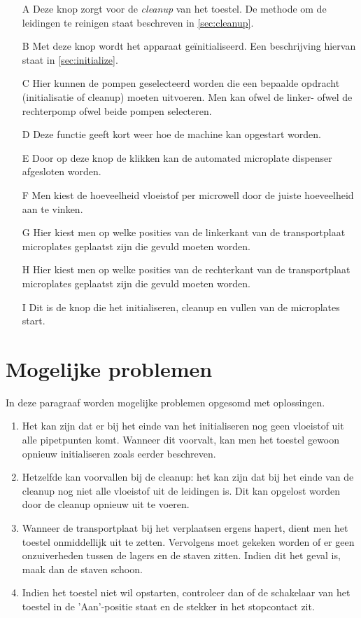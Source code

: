 \documentclass[a4paper,twoside,kulak]{kulakreport} %
\begin{document}
\begin{itemize}
	\item[A] Deze knop zorgt voor de \textit{cleanup} van het toestel. De methode om de leidingen te reinigen staat beschreven in \ref{sec:cleanup}.
	\item[B] Met deze knop wordt het apparaat geïnitialiseerd. Een beschrijving hiervan staat in \ref{sec:initialize}.
	\item[C] Hier kunnen de pompen geselecteerd worden die een bepaalde opdracht (initialisatie of cleanup) moeten uitvoeren. Men kan ofwel de linker- ofwel de rechterpomp ofwel beide pompen selecteren. 
	\item[D] Deze functie geeft kort weer hoe de machine kan opgestart worden.
	\item[E] Door op deze knop de klikken kan de automated microplate dispenser afgesloten worden.
	\item[F] Men kiest de hoeveelheid vloeistof per microwell door de juiste hoeveelheid aan te vinken.
	\item[G] Hier kiest men op welke posities van de linkerkant van de transportplaat microplates geplaatst zijn die gevuld moeten worden. 
	\item[H] Hier kiest men op welke posities van de rechterkant van de transportplaat microplates geplaatst zijn die gevuld moeten worden.
	\item[I] Dit is de knop die het initialiseren, cleanup en vullen van de microplates start.
\end{itemize}



\chapter*{Mogelijke problemen}
In deze paragraaf worden mogelijke problemen opgesomd met oplossingen.
\begin{enumerate}
	\item Het kan zijn dat er bij het einde van het initialiseren nog geen vloeistof uit alle pipetpunten komt. Wanneer dit voorvalt, kan men het toestel gewoon opnieuw initialiseren zoals eerder beschreven.
	\item Hetzelfde kan voorvallen bij de cleanup: het kan zijn dat bij het einde van de cleanup nog niet alle vloeistof uit de leidingen is. Dit kan opgelost worden door de cleanup opnieuw uit te voeren. 
	\item Wanneer de transportplaat bij het verplaatsen ergens hapert, dient men het toestel onmiddellijk uit te zetten. Vervolgens moet gekeken worden of er geen onzuiverheden tussen de lagers en de staven zitten. Indien dit het geval is, maak dan de staven schoon.
	\item Indien het toestel niet wil opstarten, controleer dan of de schakelaar van het toestel in de 'Aan'-positie staat en de stekker in het stopcontact zit. 

\end{enumerate}
\end{document}
